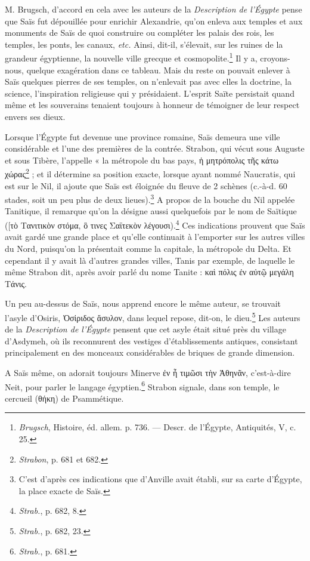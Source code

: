 \documentclass[a4paper, 11pt, oneside]{article}
\begin{document}
M. Brugsch, d'accord en cela avec les auteurs de la \emph{Description de l'Égypte} pense que Saïs fut dépouillée pour enrichir Alexandrie, qu'on enleva aux temples et aux monuments de Saïs de quoi construire ou compléter les palais des rois, les temples, les ponts, les canaux, \emph{etc.} Ainsi, dit-il, s'élevait, sur les ruines de la grandeur égyptienne, la nouvelle ville grecque et cosmopolite.\footnote{\emph{Brugsch}, Histoire, éd. allem. p. 736. --- Descr. de l'Égypte, Antiquités, V, c. 25.} Il y a, croyons-nous, quelque exagération dans ce tableau. Mais du reste on pouvait enlever à Saïs quelques pierres de ses temples, on n'enlevait pas avec elles la doctrine, la science, l'inspiration religieuse qui y présidaient. L'esprit Saïte persistait quand même et les souverains tenaient toujours à honneur de témoigner de leur respect envers ses dieux.

Lorsque l'Égypte fut devenue une province romaine, Saïs demeura une ville considérable et l'une des premières de la contrée. Strabon, qui vécut sous Auguste et sous Tibère, l'appelle « la métropole du bas pays, ἡ μητρόπολις τῆς κάτω χώρας\footnote{\emph{Strabon}, p. 681 et 682.} ; et il détermine sa position exacte, lorsque ayant nommé Naucratis, qui est sur le Nil, il ajoute que Saïs est éloignée du fleuve de 2 schènes (c.-à-d. 60 stades, soit un peu plus de deux lieues).\footnote{C'est d'après ces indications que d'Anville avait établi, sur sa carte d'Égypte, la place exacte de Saïs.} A propos de la bouche du Nil appelée Tanitique, il remarque qu'on la désigne aussi quelquefois par le nom de Saïtique ([τὸ Τανιτικὸν στόμα, ὃ τινες Σαϊτεκὸν λέγουσι).\footnote{\emph{Strab.}, p. 682, 8.} Ces indications prouvent que Saïs avait gardé une grande place et qu'elle continuait à l'emporter sur les autres villes du Nord, puisqu’on la présentait comme la capitale, la métropole du Delta. Et cependant il y avait là d'autres grandes villes, Tanis par exemple, de laquelle le même Strabon dit, après avoir parlé du nome Tanite : καὶ πόλις ἐν αὐτῷ μεγάλη Τάνις.

Un peu au-dessus de Saïs, nous apprend encore le même auteur, se trouvait l'asyle d'Osiris, Ὀσἰριδος ἄσυλον, dans lequel repose, dit-on, le dieu.\footnote{\emph{Strab.}, p. 682, 23.} Les auteurs de la \emph{Description de l'Égypte} pensent que cet asyle était situé près du village d'Asdymeh, où ils reconnurent des vestiges d'établissements antiques, consistant principalement en des monceaux considérables de briques de grande dimension.

A Saïs même, on adorait toujours Minerve ἐν ἦ τιμῶσι τὴν Ἀθηνᾶν, c'est-à-dire Neit, pour parler le langage égyptien.\footnote{\emph{Strab.}, p. 681.} Strabon signale, dans son temple, le cercueil (θήκη) de Psammétique.
\end{document}
